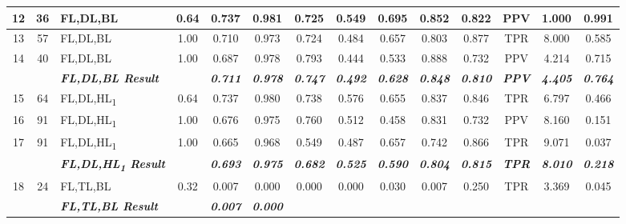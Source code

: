 \begin{table}[H]
{\begin{tabular}{cc|l|c|c|c|c|c|c|c|c|c|c|c|}
  \multicolumn{1}{|c|}{12} &
    36 &
    FL,DL,BL &
    0.64 &
    0.737 &
    0.981 &
    0.725 &
    0.549 &
    0.695 &
    0.852 &
    0.822 &
    PPV &
    1.000 &
    0.991 \\ \hline
  \multicolumn{1}{|c|}{13} &
    57 &
    FL,DL,BL &
    1.00 &
    0.710 &
    0.973 &
    0.724 &
    0.484 &
    0.657 &
    0.803 &
    0.877 &
    TPR &
    8.000 &
    0.585 \\ \hline
  \multicolumn{1}{|c|}{14} &
    40 &
    FL,DL,BL &
    1.00 &
    0.687 &
    0.978 &
    0.793 &
    0.444 &
    0.533 &
    0.888 &
    0.732 &
    PPV &
    4.214 &
    0.715 \\ \hline
   &
     &
    \textit{\textbf{FL,DL,BL Result}} &
     &
    \textit{\textbf{0.711}} &
    \textit{\textbf{0.978}} &
    \textit{\textbf{0.747}} &
    \textit{\textbf{0.492}} &
    \textit{\textbf{0.628}} &
    \textit{\textbf{0.848}} &
    \textit{\textbf{0.810}} &
    \textit{\textbf{PPV}} &
    \textit{\textbf{4.405}} &
    \textit{\textbf{0.764}} \\ \hline
  \multicolumn{1}{|c|}{15} &
    64 &
    FL,DL,HL\textsubscript{1} &
    0.64 &
    0.737 &
    0.980 &
    0.738 &
    0.576 &
    0.655 &
    0.837 &
    0.846 &
    TPR &
    6.797 &
    0.466 \\ \hline
  \multicolumn{1}{|c|}{16} &
    91 &
    FL,DL,HL\textsubscript{1} &
    1.00 &
    0.676 &
    0.975 &
    0.760 &
    0.512 &
    0.458 &
    0.831 &
    0.732 &
    PPV &
    8.160 &
    0.151 \\ \hline
  \multicolumn{1}{|c|}{17} &
    91 &
    FL,DL,HL\textsubscript{1} &
    1.00 &
    0.665 &
    0.968 &
    0.549 &
    0.487 &
    0.657 &
    0.742 &
    0.866 &
    TPR &
    9.071 &
    0.037 \\ \hline
   &
     &
    \textit{\textbf{FL,DL,HL\textsubscript{1} Result}} &
     &
    \textit{\textbf{0.693}} &
    \textit{\textbf{0.975}} &
    \textit{\textbf{0.682}} &
    \textit{\textbf{0.525}} &
    \textit{\textbf{0.590}} &
    \textit{\textbf{0.804}} &
    \textit{\textbf{0.815}} &
    \textit{\textbf{TPR}} &
    \textit{\textbf{8.010}} &
    \textit{\textbf{0.218}} \\ \hline
  \multicolumn{1}{|c|}{18} &
    24 &
    FL,TL,BL &
    0.32 &
    0.007 &
    0.000 &
    0.000 &
    0.000 &
    0.030 &
    0.007 &
    0.250 &
    TPR &
    3.369 &
    0.045 \\ \hline
   &
     &
    \textit{\textbf{FL,TL,BL Result}} &
     &
    \textit{\textbf{0.007}} &
    \textit{\textbf{0.000}} &

\end{tabular}}
\end{table}
